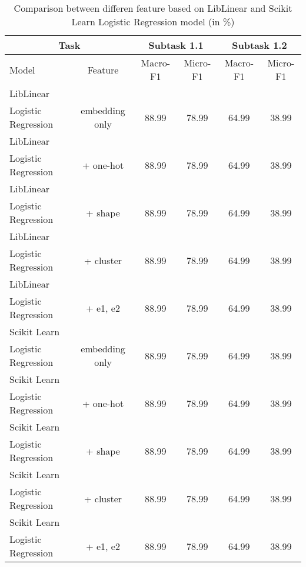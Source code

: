 \begin{table}[htbp!] %
    \begin{tabular}{lccccc}
    \toprule
        \multicolumn{2}{c}{Task}                                                 & \multicolumn{2}{c}{Subtask 1.1} & \multicolumn{2}{c}{Subtask 1.2} \\
    \midrule
        Model & Feature                                                                 & Macro-F1        & Micro-F1       & Macro-F1        & Micro-F1       \\
    \midrule
        LibLinear\\ Logistic Regression    & embedding only & 88.99            & 78.99           & 64.99            & 38.99           \\
        LibLinear\\ Logistic Regression    & + one-hot      & 88.99            & 78.99           & 64.99            & 38.99           \\
        LibLinear\\ Logistic Regression    & + shape        & 88.99            & 78.99           & 64.99            & 38.99           \\
        LibLinear\\ Logistic Regression    & + cluster      & 88.99            & 78.99           & 64.99            & 38.99           \\
        LibLinear\\ Logistic Regression    & + e1, e2       & 88.99            & 78.99           & 64.99            & 38.99           \\
        Scikit Learn\\ Logistic Regression & embedding only & 88.99            & 78.99           & 64.99            & 38.99           \\
        Scikit Learn\\ Logistic Regression & + one-hot      & 88.99            & 78.99           & 64.99            & 38.99           \\
        Scikit Learn\\ Logistic Regression & + shape        & 88.99            & 78.99           & 64.99            & 38.99           \\
        Scikit Learn\\ Logistic Regression & + cluster      & 88.99            & 78.99           & 64.99            & 38.99           \\
        Scikit Learn\\ Logistic Regression & + e1, e2       & 88.99            & 78.99           & 64.99            & 38.99           \\
    \bottomrule
    \end{tabular}
\caption{Comparison between differen feature based on LibLinear and Scikit Learn Logistic Regression model (in \%)}
\label{tab:ML_Model}
\end{table}
